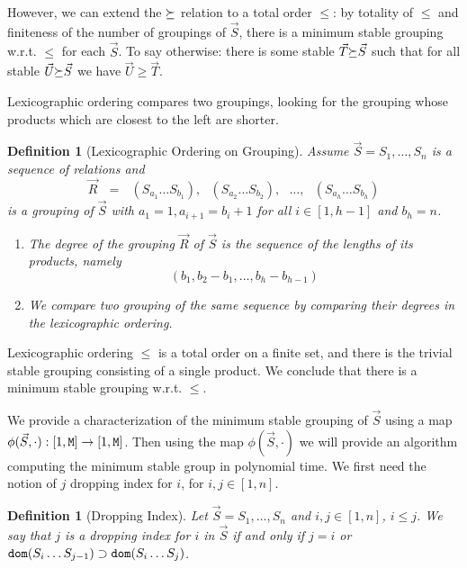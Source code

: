 \documentclass{lmcs}
\newtheorem{definition}[theorem]{Definition}
\begin{document}
However, we can extend the ${\succeq}$ relation to a total order $\le$:
by totality of $\le$ and finiteness of the number of groupings of $\vec{S}$, 
there is a minimum stable grouping  w.r.t. $\le$ for each $\vec{S}$.
To say otherwise: there is some stable $\vec{T} {\succeq} \vec{S}$ such that for all stable 
$\vec{U} {\succeq} \vec{S}$ we have $\vec{U} \ge \vec{T}$. 

Lexicographic ordering compares two groupings, looking for the grouping
whose products which are closest to the left are shorter.

\begin{definition}[Lexicographic Ordering on Grouping]
\label{definition-grouping-order}
Assume $\vec{S}=S_1, \ldots, S_n$ is a sequence of relations and 
$$
\vec{R} \ \ \ 
= \ \ \ 
(S_{a_1} \ldots S_{b_1}), \ \ \ 
(S_{a_2} \ldots S_{b_2}), \ \ \ 
\ldots, \ \ \ 
(S_{a_{h}} \ldots S_{b_{h}})
$$
is a grouping of $\vec{S}$ with $a_1=1, a_{i+1} = b_i+1$ for all $i \in [1,h-1]$ and 
$b_{h} = n$.

\begin{enumerate}
\item
The degree of the grouping $\vec{R}$ of $\vec{S}$ is the sequence
of the lengths of its products, namely 
$$
(b_1, b_2 - b_1, \ldots, b_{h} - b_{h-1})
$$

\item
We compare two grouping of the same sequence by comparing their degrees in the 
lexicographic ordering.
\end{enumerate}
\end{definition} 

Lexicographic ordering $\le$ is a total order on a finite set, and there is the trivial stable
grouping consisting of a single product. 
We conclude that there is a minimum stable grouping w.r.t. $\le$.


We provide a characterization of the minimum stable grouping of 
$\vec{S}$ using a map $\phi(\vec{S},\cdot) : [1,{\tt M}] \rightarrow  [1,{\tt M}]$. 
Then using the map $\phi(\vec{S},\cdot)$ we will provide an algorithm computing 
the minimum stable group in polynomial time. 
We first need the notion of $j$ dropping index for $i$, for $i,j \in [1,n]$.

\begin{definition}[Dropping Index]
\label{definition-dropping-index}
Let $\vec{S} = S_1, \ldots, S_n$ and $i,j \in [1,n]$, $i \le j$.
We say that $j$ is a dropping index for $i$ in $\vec{S}$
if and only if $j=i$ or ${\tt dom}(S_i \ldots S_{j-1}) \supset {\tt dom}(S_i \ldots S_j)$.  
\end{definition}
\end{document}

